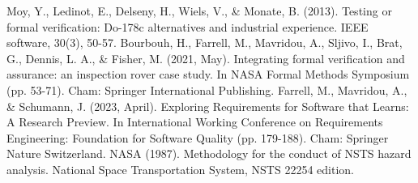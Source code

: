 \documentclass[conference]{IEEEtran}
\begin{document}
\begin{thebibliography}{00}
 Moy, Y., Ledinot, E., Delseny, H., Wiels, V., \& Monate, B. (2013). Testing or formal verification: Do-178c alternatives and industrial experience. IEEE software, 30(3), 50-57.
 Bourbouh, H., Farrell, M., Mavridou, A., Sljivo, I., Brat, G., Dennis, L. A., \& Fisher, M. (2021, May). Integrating formal verification and assurance: an inspection rover case study. In NASA Formal Methods Symposium (pp. 53-71). Cham: Springer International Publishing.
 Farrell, M., Mavridou, A., \& Schumann, J. (2023, April). Exploring Requirements for Software that Learns: A Research Preview. In International Working Conference on Requirements Engineering: Foundation for Software Quality (pp. 179-188). Cham: Springer Nature Switzerland.
 NASA (1987). Methodology for the conduct of NSTS hazard analysis. National Space Transportation System, NSTS 22254 edition.


\end{thebibliography}
\end{document}
